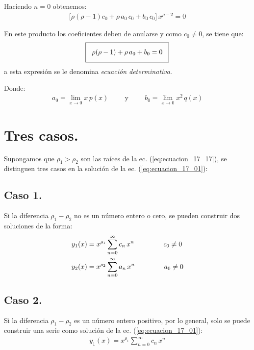 Haciendo $n = 0$ obtenemos:
\begin{align*}
\big[ \rho (\rho - 1) c_{0} + \rho \, a_{0} \, c_{0} + b_{0} \, c_{0} \big] \, x^{\rho-2} = 0
\end{align*}

En este producto los coeficientes deben de anularse y como $c_{0} \neq 0$, se tiene que:
\begin{align}
\setlength{\fboxsep}{3\fboxsep}\boxed{
\rho (\rho - 1) + \rho \, a_{0} + b_{0} = 0 }
\label{eq:ecuacion_17_17}
\end{align}
a esta expresión se le denomina \emph{ecuación determinativa}.
\par
Donde:
\begin{align}
a_{0} = \lim_{x \to 0} x \, p(x) \hspace{1cm} \mbox{y} \hspace{1cm} b_{0} = \lim_{x \to 0} x^{2} \, q(x)
\label{eq:ecuacion_17_18}
\end{align}

\section{Tres casos.}

Supongamos que $\rho_{1} > \rho_{2}$ son las raíces de la ec. (\ref{eq:ecuacion_17_17}), se distinguen tres casos en la solución de la ec. (\ref{eq:ecuacion_17_01}):

\subsection{Caso 1.}\label{caso1}

Si la diferencia $\rho_{1} - \rho_{2}$ no es un número entero o cero, se pueden construir dos soluciones de la forma:
\begin{align*}
y_{1}(x) &= x^{\rho_{1}} \sum_{n=0}^{\infty} c_{n} \, x^{n} \hspace{1.5cm} c_{0} \neq 0 \\ 
y_{2}(x) &= x^{\rho_{2}} \sum_{n=0}^{\infty} a_{n} \, x^{n} \hspace{1.5cm} a_{0} \neq 0
\end{align*}

\subsection{Caso 2.} \label{caso2}

Si la diferencia $\rho_{1} - \rho_{2}$ es un número entero positivo, por lo general, solo se puede construir una serie como solución de la ec. (\ref{eq:ecuacion_17_01}):
\begin{align}
y_{1}(x) = x^{\rho_{1}} \sum_{n=0}^{\infty} c_{n} \, x^{n}
\label{eq:ecuacion_17_19}
\end{align}

